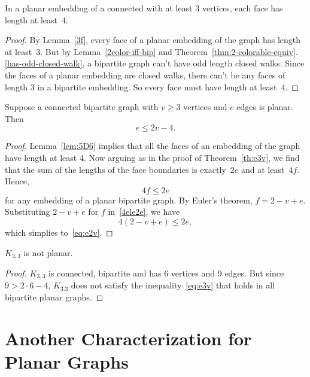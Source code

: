 \begin{lemma}\label{lem:5D6}
In a planar embedding of a connected  with at
least 3 vertices, each face has length at least~4.
\end{lemma}

\begin{proof}
  By Lemma~\ref{3f}, every face of a planar embedding of the graph has
  length at least~3.  But by Lemma~\ref{2color-iff-bip} and
  Theorem~\ref{thm:2-colorable-equiv}.\ref{has-odd-closed-walk}, a
    bipartite graph can't have odd length closed walks.  Since the faces
    of a planar embedding are closed walks, there can't be any faces of
    length 3 in a bipartite embedding.  So every face must have length at
    least~4.
\end{proof}

\begin{theorem}\label{th:e2v}
Suppose a connected bipartite graph with $v \geq 3$ vertices and $e$ edges
is planar.  Then
\begin{equation}\label{eq:e2v}
    e \leq 2v-4.
\end{equation}
\end{theorem}

\begin{proof}
  Lemma~\ref{lem:5D6} implies that all the faces of an embedding of the
  graph have length at least 4.  Now arguing as in the proof of
  Theorem~\ref{th:e3v}, we find that the sum of the lengths of the face
  boundaries is exactly~$2e$ and at least~$4f$.  Hence,
\begin{equation}\label{4ele2e}
    4f \le 2e
\end{equation}
for any embedding of a planar bipartite graph.  By Euler's theorem,
$f=2-v+e$.  Substituting $2-v+e$ for $f$ in~\eqref{4ele2e}, we have
\[
4(2-v+e) \leq 2e,
\]
which simplies to~\eqref{eq:e2v}.
\end{proof}

\begin{corollary}\label{cor:K33-nonplanar} %
$K_{3, 3}$ is not planar.
\end{corollary}

\begin{proof}
  $K_{3,3}$ is connected, bipartite and has 6 vertices and 9 edges.  But
  since $ 9 > 2 \cdot 6-4$, $K_{3.3}$ does not satisfy the
  inequality~\eqref{eq:e3v} that holds in all bipartite planar graphs.
\end{proof}

\section{Another Characterization for Planar Graphs}

